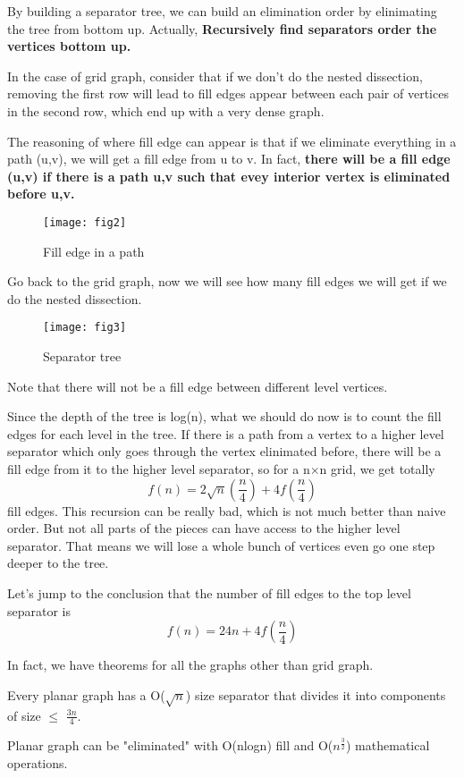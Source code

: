 \documentclass{article}
\begin{document}
	By building a separator tree, we can build an elimination order by elinimating the tree from bottom up. Actually, \textbf{Recursively find separators order the vertices bottom up. } 
	
	In the case of grid graph, consider that if we don't do the nested dissection, removing the first row will lead to fill edges appear between each pair of vertices in the second row, which end up with a very dense graph.
	
	The reasoning of where fill edge can appear is that if we eliminate everything in a path (u,v), we will get a fill edge from u to v. In fact, \textbf{there will be a fill edge (u,v) if there is a path u,v such that evey interior vertex is eliminated before u,v. }
	\begin{figure}[h!]
		\begin{center}
			\texttt{[image: fig2]}
		\end{center}
		\caption{Fill edge in a path}
	\end{figure}
    
    Go back to the grid graph, now we will see how many fill edges we will get if we do the nested dissection. 
    
    \begin{figure}[h!]
    	\begin{center}
    		\texttt{[image: fig3]}
    	\end{center}
    	\caption{Separator tree}
    \end{figure}
	
	Note that there will not be a fill edge between different level vertices. 
	
	Since the depth of the tree is log(n), what we should do now is to count the fill edges for each level in the tree. If there is a path from a vertex to a higher level separator which only goes through the vertex elinimated before, there will be a fill edge from it to the higher level separator, so for a n$\times$n grid, we get totally
	\[
	f(n) = 2\sqrt{n}(\frac{n}{4}) + 4f(\frac{n}{4})
	\]
	fill edges.
   This recursion can be really bad, which is not much better than naive order. But not all parts of the pieces can have access to the higher level separator. That means we will lose a whole bunch of vertices even go one step deeper to the tree.
   
   Let's jump to the conclusion that the number of  fill edges to the top level separator is
   \[
   f(n) = 24n + 4f(\frac{n}{4})
   \]
   
   In fact, we have theorems for all the graphs other than grid graph.
   \begin{theorem}
   	Every planar graph has a O($\sqrt{n}$) size separator that divides it into components of size $\leq$ $\frac{3n}{4}$.
   \end{theorem}
	\begin{theorem}
		Planar graph can be "eliminated" with O(nlogn) fill and O($n^{\frac{3}{2}}$) mathematical operations.
	\end{theorem}


   
\end{document}
